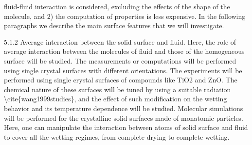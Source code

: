 fluid-fluid interaction is considered, excluding the effects of the shape of the molecule, and 2) the computation of properties is less expensive.  In the following paragraphs we describe the main surface features that we will investigate.
\par 5.1.2 Average interaction between the solid surface and fluid. Here, the role of average interaction between the molecules of fluid and those of the homogeneous surface will be studied. The measurements or computations will be performed using single crystal surfaces with different orientations. The experiments will be performed using single crystal surfaces of compounds like TiO2 and ZnO. The chemical nature of these surfaces will be tuned by using a suitable radiation \textbackslash cite\{wang1999studies\}, and the effect of such modification on the  wetting behavior and its temperature dependence will be studied. Molecular simulations will be performed for the crystalline solid surfaces made of monatomic particles. Here, one can manipulate the interaction between atoms of solid surface and fluid to cover all the wetting regimes, from complete drying to complete wetting.
